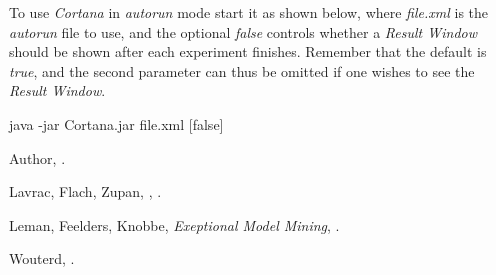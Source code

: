 \documentclass{article}
\begin{document}
To use \emph{Cortana} in \emph{autorun} mode start it as shown below, where \emph{file.xml} is the \emph{autorun} file to use, and the optional \emph{false} controls whether a \emph{Result Window} should be shown after each experiment finishes.
Remember that the default is \emph{true}, and the second parameter can thus be omitted if one wishes to see the \emph{Result Window}.

java -jar Cortana.jar file.xml [false]





\begin{thebibliography}{10}

Author,
.

Lavrac, Flach, Zupan,
,
.

Leman, Feelders, Knobbe,
\newblock \emph{Exeptional Model Mining},
.

Wouterd,
.

\end{thebibliography}
\end{document}
